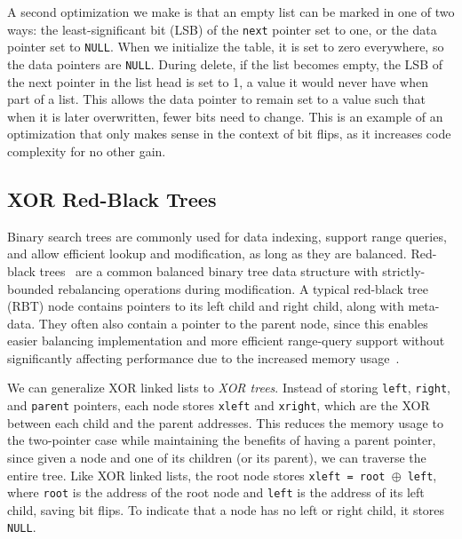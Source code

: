 A second optimization we make is that an empty list can be marked in one of two ways: the
least-significant bit (LSB) of the \texttt{next} pointer set to one, or the data pointer set to
\texttt{NULL}. When we initialize the table, it is set to zero everywhere, so the data pointers
are \texttt{NULL}.  During delete, if the list becomes empty, the LSB of the next
pointer in the list head is set to 1, a value it would never have when part of a list. This
allows the data pointer to remain set to a value such that when it is later overwritten, fewer bits
need to change. This is an example of an optimization that only makes sense in the context of bit
flips, as it increases code complexity for no other gain.

\subsection{XOR Red-Black Trees}
\label{sec:xrbt_design}

Binary search trees are commonly used for data indexing, support range queries,
and allow efficient lookup and modification, as long as they are balanced.
Red-black trees~\cite{rbt,clrs} are a common balanced binary tree data structure with
strictly-bounded rebalancing operations during modification. A typical red-black
tree (RBT) node contains pointers to its left child and right child, along with
meta-data. They often also contain a pointer to the parent node, since this
enables easier balancing implementation and more efficient range-query support
without significantly affecting performance due to the increased memory
usage~\cite{rbt_llh}.

We can generalize XOR linked lists to \textit{XOR trees}. Instead of storing
\texttt{left}, \texttt{right}, and \texttt{parent} pointers, each node stores
\texttt{xleft} and \texttt{xright}, which are the XOR between each child and
the parent addresses. This reduces the memory usage to the two-pointer case
while maintaining the benefits of having a parent pointer, since given a node
and one of its children (or its parent), we can traverse the entire tree. Like
XOR linked lists, the root node stores \texttt{xleft = root $\oplus$ left}, where
\texttt{root} is the address of the root node and \texttt{left} is the address
of its left child, saving bit flips. To indicate that a node has no left or right child, it
stores \texttt{NULL}.

